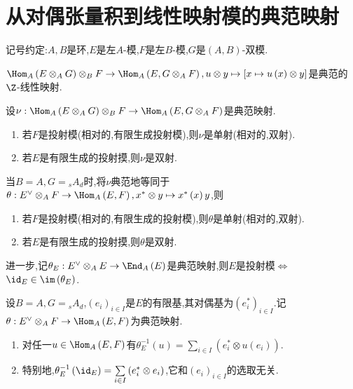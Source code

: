 \section{从对偶张量积到线性映射模的典范映射}

记号约定:$A,B$是环,$E$是左$A$-模,$F$是左$B$-模,$G$是$\left(A,B\right)$-双模.

\begin{proposition}{}{}
	$\Hom_{A}\left(E\otimes_{A}G\right)\otimes_{B}F\to\Hom_{A}\left(E,G\otimes_{A}F\right),u\otimes y\mapsto\left[x\mapsto u\left(x\right)\otimes y\right]$是典范的$\Z$-线性映射.
\end{proposition}

\begin{proposition}{}{}
	设$\nu:\Hom_{A}\left(E\otimes_{A}G\right)\otimes_{B}F\to\Hom_{A}\left(E,G\otimes_{A}F\right)$是典范映射.
	\begin{enumerate}
		\item 若$F$是投射模(相对的,有限生成投射模),则$\nu$是单射(相对的,双射).
		\item 若$E$是有限生成的投射摸,则$\nu$是双射.
	\end{enumerate}
\end{proposition}

\begin{remark}{}{}
	当$B=A,G={}_{s}A_{d}$时,将$\nu$典范地等同于$\theta:E^{\vee}\otimes_{A}F\to\Hom_{A}\left(E,F\right),x^{\ast}\otimes y\mapsto x^{\ast}\left(x\right)y$,则
	\begin{enumerate}
		\item 若$F$是投射模(相对的,有限生成的投射模),则$\theta$是单射(相对的,双射).
		\item 若$E$是有限生成的投射摸,则$\theta$是双射.
	\end{enumerate}
	进一步,记$\theta_{E}:E^{\vee}\otimes_{A}E\to\End_{A}\left(E\right)$是典范映射,则$E$是投射模$\iff$ $\id_{E}\in\im\left(\theta_{E}\right)$.
\end{remark}

\begin{proposition}{}{}
	设$B=A,G={}_{s}A_{d}$,$\left(e_{i}\right)_{i\in I}$是$E$的有限基,其对偶基为$\left(e_{i}^{\ast}\right)_{i\in I}$.记$\theta:E^{\vee}\otimes_{A}F\to\Hom_{A}\left(E,F\right)$为典范映射.
	\begin{enumerate}
		\item 对任一$u\in\Hom_{A}\left(E,F\right)$有$\theta_{E}^{-1}\left(u\right)=\sum\limits_{i\in I}\left(e_{i}^{\ast}\otimes u\left(e_{i}\right)\right)$.
		\item 特别地,$\theta_{E}^{-1}\left(\id_{E}\right)=\sum\limits_{i\in I}\left(e_{i}^{\ast}\otimes e_{i}\right)$,它和$\left(e_{i}\right)_{i\in I}$的选取无关.
	\end{enumerate}
\end{proposition}

